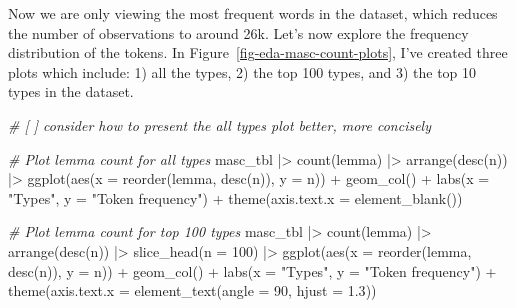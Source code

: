 \documentclass[
  letterpaper,
  DIV=11,
  numbers=noendperiod]{scrreport}
\newenvironment{Shaded}{\begin{snugshade}}{\end{snugshade}}
\newcommand{\AttributeTok}[1]{\textcolor[rgb]{0.00,0.00,0.00}{#1}}
\newcommand{\CommentTok}[1]{\textcolor[rgb]{0.00,0.00,0.00}{\textit{#1}}}
\newcommand{\DecValTok}[1]{\textcolor[rgb]{0.00,0.00,0.00}{#1}}
\newcommand{\FloatTok}[1]{\textcolor[rgb]{0.00,0.00,0.00}{#1}}
\newcommand{\FunctionTok}[1]{\textcolor[rgb]{0.00,0.00,0.00}{#1}}
\newcommand{\NormalTok}[1]{\textcolor[rgb]{0.00,0.00,0.00}{#1}}
\newcommand{\SpecialCharTok}[1]{\textcolor[rgb]{0.00,0.00,0.00}{#1}}
\newcommand{\StringTok}[1]{\textcolor[rgb]{0.00,0.00,0.00}{#1}}
\theoremstyle{definition}
\theoremstyle{remark}
\begin{document}
Now we are only viewing the most frequent words in the dataset, which
reduces the number of observations to around 26k. Let's now explore the
frequency distribution of the tokens. In
Figure~\ref{fig-eda-masc-count-plots}, I've created three plots which
include: 1) all the types, 2) the top 100 types, and 3) the top 10 types
in the dataset.

\begin{Shaded}
\begin{Highlighting}[]
\CommentTok{\# [ ] consider how to present the \textquotesingle{}all types\textquotesingle{} plot better, more concisely}

\CommentTok{\# Plot lemma count for all types}
\NormalTok{masc\_tbl }\SpecialCharTok{|\textgreater{}} 
  \FunctionTok{count}\NormalTok{(lemma) }\SpecialCharTok{|\textgreater{}}
  \FunctionTok{arrange}\NormalTok{(}\FunctionTok{desc}\NormalTok{(n)) }\SpecialCharTok{|\textgreater{}}
  \FunctionTok{ggplot}\NormalTok{(}\FunctionTok{aes}\NormalTok{(}\AttributeTok{x =} \FunctionTok{reorder}\NormalTok{(lemma, }\FunctionTok{desc}\NormalTok{(n)), }\AttributeTok{y =}\NormalTok{ n)) }\SpecialCharTok{+}
  \FunctionTok{geom\_col}\NormalTok{() }\SpecialCharTok{+}
  \FunctionTok{labs}\NormalTok{(}\AttributeTok{x =} \StringTok{"Types"}\NormalTok{, }\AttributeTok{y =} \StringTok{"Token frequency"}\NormalTok{) }\SpecialCharTok{+}
  \FunctionTok{theme}\NormalTok{(}\AttributeTok{axis.text.x =} \FunctionTok{element\_blank}\NormalTok{())}

\CommentTok{\# Plot lemma count for top 100 types}
\NormalTok{masc\_tbl }\SpecialCharTok{|\textgreater{}}
  \FunctionTok{count}\NormalTok{(lemma) }\SpecialCharTok{|\textgreater{}}
  \FunctionTok{arrange}\NormalTok{(}\FunctionTok{desc}\NormalTok{(n)) }\SpecialCharTok{|\textgreater{}}
  \FunctionTok{slice\_head}\NormalTok{(}\AttributeTok{n =} \DecValTok{100}\NormalTok{) }\SpecialCharTok{|\textgreater{}}
  \FunctionTok{ggplot}\NormalTok{(}\FunctionTok{aes}\NormalTok{(}\AttributeTok{x =} \FunctionTok{reorder}\NormalTok{(lemma, }\FunctionTok{desc}\NormalTok{(n)), }\AttributeTok{y =}\NormalTok{ n)) }\SpecialCharTok{+}
  \FunctionTok{geom\_col}\NormalTok{() }\SpecialCharTok{+}
  \FunctionTok{labs}\NormalTok{(}\AttributeTok{x =} \StringTok{"Types"}\NormalTok{, }\AttributeTok{y =} \StringTok{"Token frequency"}\NormalTok{) }\SpecialCharTok{+}
  \FunctionTok{theme}\NormalTok{(}\AttributeTok{axis.text.x =} \FunctionTok{element\_text}\NormalTok{(}\AttributeTok{angle =} \DecValTok{90}\NormalTok{, }\AttributeTok{hjust =} \FloatTok{1.3}\NormalTok{))}


\end{Highlighting}
\end{Shaded}
\end{document}
